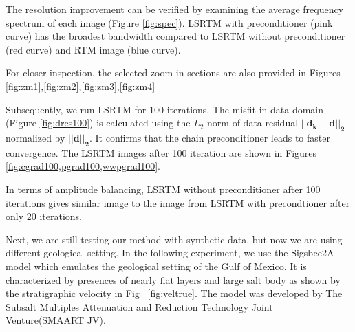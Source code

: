 
%

The resolution improvement can be verified by examining the average frequency spectrum of each image (Figure \ref{fig:spec}). LSRTM with preconditioner (pink curve) has the broadest bandwidth compared to LSRTM without preconditioner (red curve) and RTM image (blue curve). 



%

For closer inspection, the selected zoom-in sections are also provided in Figures \ref{fig:zm1},\ref{fig:zm2},\ref{fig:zm3},\ref{fig:zm4}


%

Subsequently, we run LSRTM for 100 iterations. The misfit in data domain (Figure \ref{fig:dres100}) is calculated using the $L_2$-norm of data residual $\mathbf{|| d_k - d ||_{2}}$ normalized by $\mathbf{||d ||_{2}}$. It confirms that the chain preconditioner leads to faster convergence. The LSRTM images after 100 iteration are shown in Figures \ref{fig:cgrad100,pgrad100,wwpgrad100}. 





In terms of amplitude balancing, LSRTM without preconditioner after 100 iterations gives similar image to the image from LSRTM with precondtioner after only 20 iterations.


\newpage
{}

Next, we are still testing our method with synthetic data, but now we are using different geological setting. In the following experiment, we use the Sigsbee2A model which emulates the geological setting of the Gulf of Mexico. It is characterized by presences of nearly flat layers and large salt body as shown by the stratigraphic velocity in Fig ~\ref{fig:veltrue}. The model was developed by The  Subsalt  Multiples  Attenuation  and  Reduction  Technology  Joint  Venture(SMAART JV).

